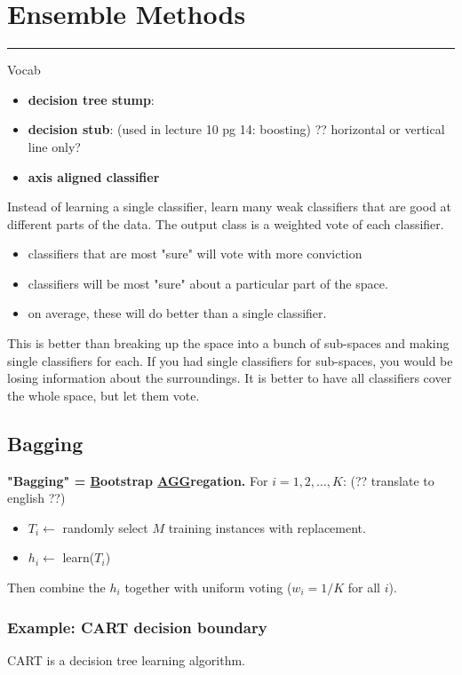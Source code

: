 \section{Ensemble Methods}
\smallskip \hrule height 2pt \smallskip

Vocab
\begin{itemize}
	\item \textbf{decision tree stump}: 
	\item \textbf{decision stub}:  (used in lecture 10 pg 14: boosting)  ?? horizontal or vertical line only?  
	\item \textbf{axis aligned classifier}
\end{itemize}

Instead of learning a single classifier, learn many weak classifiers that are good at different parts of the data. 
The output class is a weighted vote of each classifier. 
\begin{itemize}
	\item classifiers that are most "sure" will vote with more conviction
	\item classifiers will be most "sure" about a particular part of the space. 
	\item on average, these will do better than a single classifier. 
\end{itemize}

This is better than breaking up the space into a bunch of sub-spaces and making single classifiers for each.  
If you had single classifiers for sub-spaces, you would be losing information about the surroundings.
It is better to have all classifiers cover the whole space, but let them vote. 

\subsection{Bagging}
\textbf{"Bagging" = \underline{B}ootstrap \underline{AGG}regation.}
For $i = 1, 2, \dots, K$:   (?? translate to english ??) 
\begin{itemize}
	\item $T_i \leftarrow$ randomly select $M$ training instances with replacement.
	\item $h_i \leftarrow$ learn($T_i$)
\end{itemize}
Then combine the $h_i$ together with uniform voting ($w_i = 1/K$ for all $i$).

\subsubsection{Example: CART decision boundary}
CART is a decision tree learning algorithm. \hfill \\

